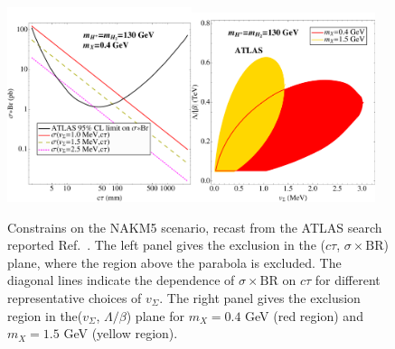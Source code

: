 \begin{figure}[!t]\centering
\includegraphics[width=0.48\textwidth,angle=0]{ch5-figures/dvlj_atlas_recast_0.pdf}\hspace*{2mm}\includegraphics[width=0.48\textwidth,angle=0]{ch5-figures/dvlj_atlas_recast.pdf}
\caption{Constrains on the NAKM5 scenario, recast from the ATLAS search reported Ref.~\cite{Aad:2014yea}. The left panel gives the exclusion in the ($c\tau$, $\sigma\times\text{BR}$) plane, where the region above the parabola is excluded. The diagonal lines indicate the dependence of $\sigma\times\text{BR}$ on $c\tau$ for different representative choices of $v_\Sigma$. The right panel gives the exclusion region in the($v_\Sigma$, $\Lambda/\beta$) plane for $m_X=0.4$ GeV (red region) and $m_X=1.5$ GeV (yellow region).} %
\label{fig:ch5-ATLASbounds}
\end{figure}

